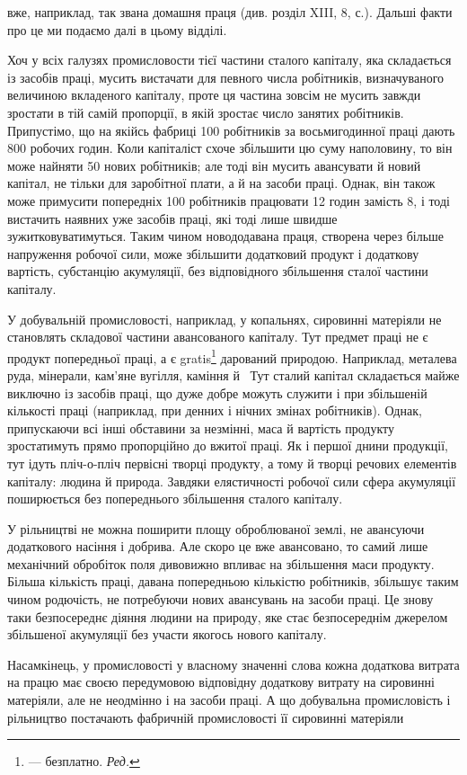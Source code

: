 \parcont{}  %
вже, наприклад, так звана домашня праця (див. розділ XIII,
8, с.). Дальші факти про це ми подаємо далі в цьому відділі.

Хоч у всіх галузях промисловости тієї частини сталого капіталу,
яка складається із засобів праці, мусить вистачати для
певного числа робітників, визначуваного величиною вкладеного
капіталу, проте ця частина зовсім не мусить завжди зростати в
тій самій пропорції, в якій зростає число занятих робітників.
Припустімо, що на якійсь фабриці 100 робітників за восьмигодинної
праці дають 800 робочих годин. Коли капіталіст схоче
збільшити цю суму наполовину, то він може найняти 50 нових
робітників; але тоді він мусить авансувати й новий капітал,
не тільки для заробітної плати, а й на засоби праці. Однак, він
також може примусити попередніх 100 робітників працювати
12 годин замість 8, і тоді вистачить наявних уже засобів праці,
які тоді лише швидше зужитковуватимуться. Таким чином новододавана
праця, створена через більше напруження робочої сили,
може збільшити додатковий продукт і додаткову вартість, субстанцію
акумуляції, без відповідного збільшення сталої частини
капіталу.

У добувальній промисловості, наприклад, у копальнях, сировинні
матеріяли не становлять складової частини авансованого
капіталу. Тут предмет праці не є продукт попередньої праці, а
є gratis\footnote*{
— безплатно. \emph{Ред.}
} дарований природою. Наприклад, металева руда, мінерали,
кам’яне вугілля, каміння й~ Тут сталий капітал складається
майже виключно із засобів праці, що дуже добре можуть
служити і при збільшеній кількості праці (наприклад, при денних
і нічних змінах робітників). Однак, припускаючи всі інші
обставини за незмінні, маса й вартість продукту зростатимуть
прямо пропорційно до вжитої праці. Як і першої днини продукції,
тут ідуть пліч-о-пліч первісні творці продукту, а тому й творці
речових елементів капіталу: людина й природа. Завдяки елястичності
робочої сили сфера акумуляції поширюється без попереднього
збільшення сталого капіталу.

У рільництві не можна поширити площу оброблюваної землі,
не авансуючи додаткового насіння і добрива. Але скоро це вже
авансовано, то самий лише механічний обробіток поля дивовижно
впливає на збільшення маси продукту. Більша кількість
праці, давана попередньою кількістю робітників, збільшує таким
чином родючість, не потребуючи нових авансувань на засоби
праці. Це знову таки безпосереднє діяння людини на природу,
яке стає безпосереднім джерелом збільшеної акумуляції без
участи якогось нового капіталу.

Насамкінець, у промисловості у власному значенні слова
кожна додаткова витрата на працю має своєю передумовою відповідну
додаткову витрату на сировинні матеріяли, але не неодмінно
і на засоби праці. А що добувальна промисловість і рільництво
постачають фабричній промисловості її сировинні матеріяли
\parbreak{}  %
